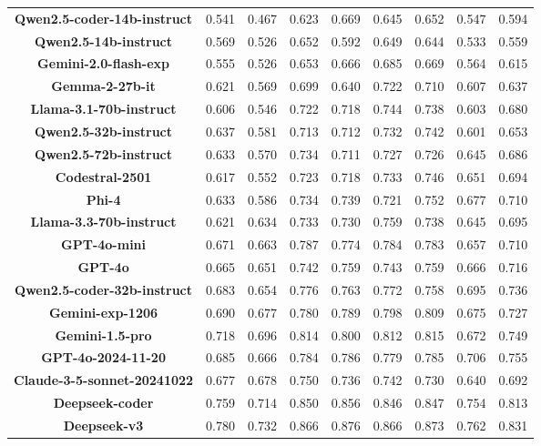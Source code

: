 \begin{table}[h]
{\begin{tabular}{ccccccccc}
\textbf{Qwen2.5-coder-14b-instruct} & 0.541 & 0.467 & 0.623 & 0.669 & 0.645 & 0.652 & 0.547 & 0.594 \\
\textbf{Qwen2.5-14b-instruct} & 0.569 & 0.526 & 0.652 & 0.592 & 0.649 & 0.644 & 0.533 & 0.559 \\
\textbf{Gemini-2.0-flash-exp} & 0.555 & 0.526 & 0.653 & 0.666 & 0.685 & 0.669 & 0.564 & 0.615 \\
\textbf{Gemma-2-27b-it} & 0.621 & 0.569 & 0.699 & 0.640 & 0.722 & 0.710 & 0.607 & 0.637 \\
\textbf{Llama-3.1-70b-instruct} & 0.606 & 0.546 & 0.722 & 0.718 & 0.744 & 0.738 & 0.603 & 0.680 \\
\textbf{Qwen2.5-32b-instruct} & 0.637 & 0.581 & 0.713 & 0.712 & 0.732 & 0.742 & 0.601 & 0.653 \\
\textbf{Qwen2.5-72b-instruct} & 0.633 & 0.570 & 0.734 & 0.711 & 0.727 & 0.726 & 0.645 & 0.686 \\
\textbf{Codestral-2501} & 0.617 & 0.552 & 0.723 & 0.718 & 0.733 & 0.746 & 0.651 & 0.694 \\
\textbf{Phi-4} & 0.633 & 0.586 & 0.734 & 0.739 & 0.721 & 0.752 & 0.677 & 0.710 \\
\textbf{Llama-3.3-70b-instruct} & 0.621 & 0.634 & 0.733 & 0.730 & 0.759 & 0.738 & 0.645 & 0.695 \\
\textbf{GPT-4o-mini} & 0.671 & 0.663 & 0.787 & 0.774 & 0.784 & 0.783 & 0.657 & 0.710 \\
\textbf{GPT-4o} & 0.665 & 0.651 & 0.742 & 0.759 & 0.743 & 0.759 & 0.666 & 0.716 \\
\textbf{Qwen2.5-coder-32b-instruct} & 0.683 & 0.654 & 0.776 & 0.763 & 0.772 & 0.758 & 0.695 & 0.736 \\
\textbf{Gemini-exp-1206} & 0.690 & 0.677 & 0.780 & 0.789 & 0.798 & 0.809 & 0.675 & 0.727 \\
\textbf{Gemini-1.5-pro} & 0.718 & 0.696 & 0.814 & 0.800 & 0.812 & 0.815 & 0.672 & 0.749 \\
\textbf{GPT-4o-2024-11-20} & 0.685 & 0.666 & 0.784 & 0.786 & 0.779 & 0.785 & 0.706 & 0.755 \\
\textbf{Claude-3-5-sonnet-20241022} & 0.677 & 0.678 & 0.750 & 0.736 & 0.742 & 0.730 & 0.640 & 0.692 \\
\textbf{Deepseek-coder} & 0.759 & 0.714 & 0.850 & 0.856 & 0.846 & 0.847 & 0.754 & 0.813 \\
\textbf{Deepseek-v3} & 0.780 & 0.732 & 0.866 & 0.876 & 0.866 & 0.873 & 0.762 & 0.831 \\

\bottomrule

\end{tabular}}
\end{table}



